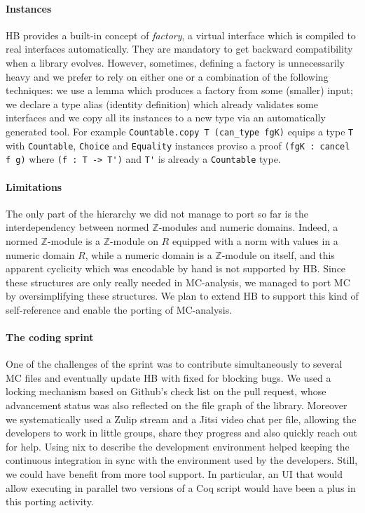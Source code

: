 \documentclass{easychair}
\def\MC{{\sf MC}}
\def\HB{{\sf HB}}
\def\newterm#1{{\it #1}}
\begin{document}
\paragraph{Instances}

\HB{} provides a built-in concept of \newterm{factory}, a virtual interface which is
compiled to real interfaces automatically. They are mandatory to get backward
compatibility when a library evolves. However, sometimes, defining a factory is
unnecessarily heavy and we prefer to rely on either one or a combination of the
following techniques: we use a lemma which produces a
factory from some (smaller) input; we declare a type alias (identity definition)
which already validates some interfaces and we copy all its instances to a new
type via an automatically generated tool. For example
\verb+Countable.copy T (can_type fgK)+ equips a type \verb+T+ with
\verb+Countable+, \verb+Choice+ and \verb+Equality+ instances proviso a
proof \verb+(fgK : cancel f g)+ where \verb+(f : T -> T')+ and \verb+T'+
is already a \verb+Countable+ type.

\paragraph{Limitations}

The only part of the hierarchy we did not manage to port so far is the
interdependency between normed $\mathbb{Z}$-modules and numeric domains.
Indeed, a normed $\mathbb{Z}$-module is a $\mathbb{Z}$-module on $R$
equipped with a norm with values in a numeric domain $R$,
while a numeric domain is a $\mathbb{Z}$-module on itself, and this apparent
cyclicity which was encodable by hand is not supported by \HB{}.
Since these structures are only really needed in \MC{}-analysis,
we managed to port \MC{} by oversimplifying these structures.
We plan to extend \HB{} to support this kind of self-reference
and enable the porting of \MC{}-analysis.

\paragraph{The coding sprint}

One of the challenges of the sprint was to contribute simultaneously
to several \MC{} files and eventually update \HB{} with fixed for blocking bugs.
We used a locking mechanism based on Github's check list on the pull request,
whose advancement status was also reflected on the file graph of the library.
Moreover we systematically used a Zulip stream and a Jitsi video chat per file,
allowing the developers to work in little groups, share they progress and
also quickly reach out for help. Using nix to describe the development
environment helped keeping the continuous integration in sync with the
environment used by the developers.
Still, we could have benefit from more tool support. In particular,
an UI that would allow executing in parallel two versions of a Coq script
would have been a plus in this porting activity.
\end{document}

